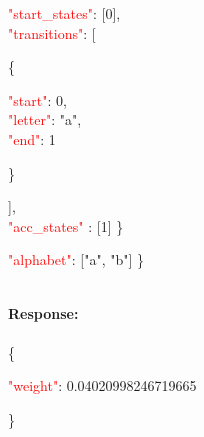      \begin{adjustwidth}{7.5 mm}{0 cm}
     \begin{adjustwidth}{7.5 mm}{0 cm}
            \textcolor{red}{"start\_states"}: [0],\\
            \textcolor{red}{"transitions"}: [
            \begin{adjustwidth}{7.5 mm}{0 cm}
            \{
               \begin{adjustwidth}{7.5 mm}{0 cm}
                    \textcolor{red}{"start"}: 0,\\
                    \textcolor{red}{"letter"}: "a",\\
                    \textcolor{red}{"end"}: 1
               \end{adjustwidth}
            \}
            \end{adjustwidth}
            ],\\
        \textcolor{red}{"acc\_states" }: [1]  \}
    \end{adjustwidth}
    \end{adjustwidth}
   \begin{adjustwidth}{7.5 mm}{0 cm}
    \textcolor{red}{"alphabet"}: ["a", "b"] \}
    \end{adjustwidth}
\ \\
\textbf{Response:}\\
\ \\
\{
\begin{adjustwidth}{7.5 mm}{0 cm}
    \textcolor{red}{"weight"}: 0.04020998246719665
\end{adjustwidth}
\}


